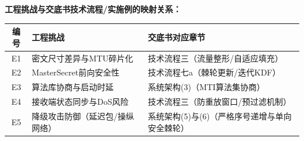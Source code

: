 \documentclass[12pt,a4paper]{article}
\begin{document}
\textbf{工程挑战与交底书技术流程/实施例的映射关系：}
\begin{center}
\begin{tabular}{|c|p{5cm}|p{6cm}|}
\hline
\textbf{编号} & \textbf{工程挑战} & \textbf{交底书对应章节} \\
\hline
E1 & 密文尺寸差异与MTU碎片化 & 技术流程三（流量整形/自适应填充） \\
\hline
E2 & MasterSecret前向安全性 & 技术流程七a（棘轮更新/迭代KDF） \\
\hline
E3 & 算法库协商与启动时延 & 系统架构(3)（MTI算法集协商） \\
\hline
E4 & 接收端状态同步与DoS风险 & 技术流程三（防重放窗口/预过滤机制） \\
\hline
E5 & 降级攻击防御（延迟包/操纵网络） & 系统架构(5)与(6)（严格序号递增与单向安全棘轮） \\
\hline
\end{tabular}
\end{center}
\end{document}
